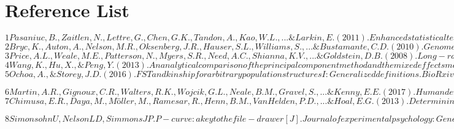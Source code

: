 \documentclass[12pt]{article}
\theoremstyle{definition}
\theoremstyle{plain}
\begin{document}
\section{Reference List}
$
1
Pasaniuc, B., Zaitlen, N., Lettre, G., Chen, G. K., Tandon, A., Kao, W. L., ... \& Larkin, E. (2011). Enhanced statistical tests for GWAS in admixed populations: assessment using African Americans from CARe and a Breast Cancer Consortium. PLoS genetics, 7(4), e1001371.
$\\

$
2
Bryc, K., Auton, A., Nelson, M. R., Oksenberg, J. R., Hauser, S. L., Williams, S., ... \& Bustamante, C. D. (2010). Genome-wide patterns of population structure and admixture in West Africans and African Americans. Proceedings of the National Academy of Sciences, 107(2), 786-791.
$\\

$
3
Price, A. L., Weale, M. E., Patterson, N., Myers, S. R., Need, A. C., Shianna, K. V., ... \& Goldstein, D. B. (2008). Long-range LD can confound genome scans in admixed populations. The American Journal of Human Genetics, 83(1), 132-135.
$\\

$
4
Wang, K., Hu, X., \& Peng, Y. (2013). An analytical comparison of the principal component method and the mixed effects model for association studies in the presence of cryptic relatedness and population stratification. Human heredity, 76(1), 1-9.
$\\



$
5
Ochoa, A., \& Storey, J. D. (2016). FST and kinship for arbitrary population structures I: Generalized definitions. BioRxiv, 083915.
$

$
6
Martin, A. R., Gignoux, C. R., Walters, R. K., Wojcik, G. L., Neale, B. M., Gravel, S., ... \& Kenny, E. E. (2017). Human demographic history impacts genetic risk prediction across diverse populations. The American Journal of Human Genetics, 100(4), 635-649.
$\\


$
7
Chimusa, E. R., Daya, M., Möller, M., Ramesar, R., Henn, B. M., Van Helden, P. D., ... \& Hoal, E. G. (2013). Determining ancestry proportions in complex admixture scenarios in South Africa using a novel proxy ancestry selection method. PLoS One, 8(9), e73971.
$

$
8
Simonsohn U, Nelson L D, Simmons J P. P-curve: a key to the file-drawer[J]. Journal of experimental psychology: General, 2014, 143(2): 534.
$
\end{document}
